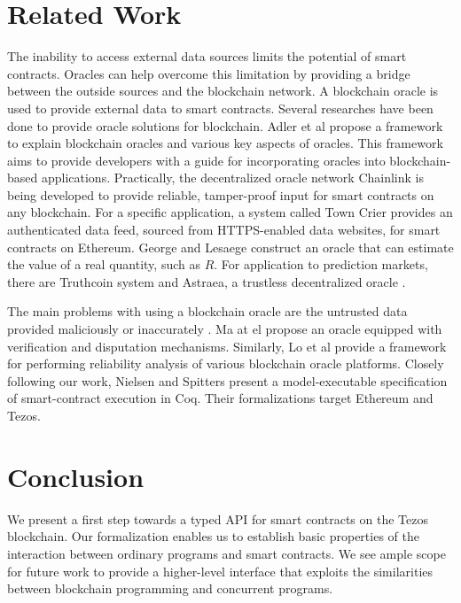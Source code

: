 \documentclass[a4paper]{llncs}
\begin{document}
\section{Related Work}
\label{sec:related work}
The inability to access external data sources limits the potential of
smart contracts. Oracles
\cite{oracle-patterns,call-action-oracle,oracles-study} can help
overcome this limitation by providing a bridge between the outside
sources and the blockchain network. A blockchain oracle is used to
provide external data to smart contracts. Several researches have been
done to provide oracle solutions for blockchain. Adler et al
\cite{blockchain-oracles} propose a framework to explain blockchain
oracles and various key aspects of oracles. This framework aims to
provide developers with a guide for incorporating oracles into
blockchain-based applications. Practically, the decentralized oracle
network Chainlink \cite{chainlink-whitepaper} is being developed to
provide reliable, tamper-proof input for smart contracts on any
blockchain. For a specific application, a system called Town Crier
\cite{town-crier} provides an authenticated data feed, sourced from
HTTPS-enabled data websites, for smart contracts on Ethereum. George
and Lesaege \cite{oracle-real-value} construct an oracle that can
estimate the value of a real quantity, such as $R$.  
For application to prediction markets, there are Truthcoin system
\cite{truthcoin-whitepaper} and Astraea, a trustless decentralized
oracle \cite{astraea}.   

The main problems with using a blockchain oracle are the untrusted
data provided maliciously or inaccurately \cite{trustworthy}. Ma at el
\cite{reliable-oracle} propose an oracle equipped with 
verification and disputation mechanisms. Similarly, Lo et al
\cite{reliablity-oracles} provide a framework for performing
reliability analysis of various blockchain oracle platforms. Closely
following our work, Nielsen and Spitters \cite{interact-coq} present a
model-executable specification of smart-contract execution in
Coq. Their formalizations target Ethereum and Tezos.  

\section{Conclusion}
\label{sec:conclusion}

We present a first step towards a typed API for smart contracts on the
Tezos blockchain. Our formalization enables us to establish basic
properties of the interaction between ordinary programs and smart
contracts. We see ample scope for future work to provide a
higher-level interface that exploits the similarities between
blockchain programming and concurrent programs.
\end{document}
